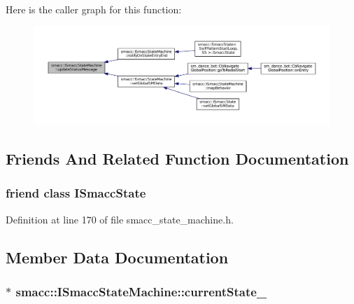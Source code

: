 Here is the caller graph for this function\+:
\nopagebreak
\begin{figure}[H]
\begin{center}
\leavevmode
\includegraphics[width=350pt]{classsmacc_1_1ISmaccStateMachine_ad246a49015fadaeb0b1639d7ab99f7d0_icgraph}
\end{center}
\end{figure}




\subsection{Friends And Related Function Documentation}
\subsubsection[{\texorpdfstring{I\+Smacc\+State}{ISmaccState}}]{\setlength{\rightskip}{0pt plus 5cm}friend class {\bf I\+Smacc\+State}\hspace{0.3cm}{\ttfamily [friend]}}\hypertarget{classsmacc_1_1ISmaccStateMachine_ab907e4cdbf326246355f56640780162e}{}\label{classsmacc_1_1ISmaccStateMachine_ab907e4cdbf326246355f56640780162e}


Definition at line 170 of file smacc\+\_\+state\+\_\+machine.\+h.



\subsection{Member Data Documentation}
\subsubsection[{\texorpdfstring{current\+State\+\_\+}{currentState_}}]{$\ast$ smacc\+::\+I\+Smacc\+State\+Machine\+::current\+State\+\_\+\hspace{0.3cm}{\ttfamily [protected]}}\hypertarget{classsmacc_1_1ISmaccStateMachine_a9c6e7745205bcce80a301f2fbe8f7e99}{}\label{classsmacc_1_1ISmaccStateMachine_a9c6e7745205bcce80a301f2fbe8f7e99}


